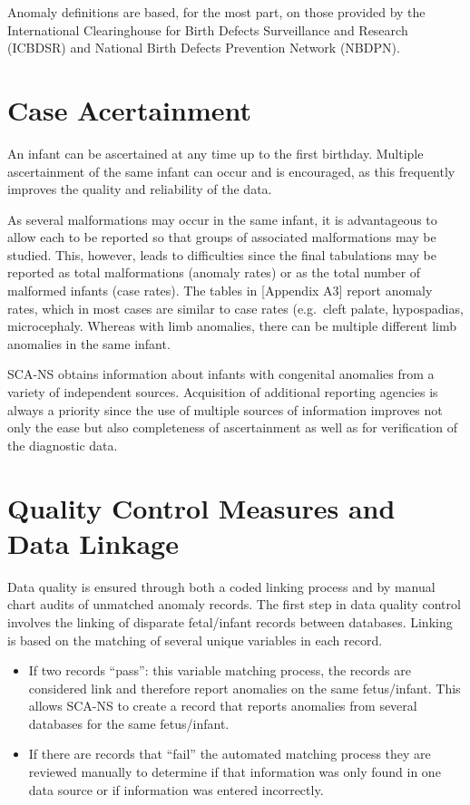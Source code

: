 \documentclass[
]{krantz}
\begin{document}
Anomaly definitions are based, for the most part, on those provided by the International Clearinghouse for Birth Defects Surveillance and Research (ICBDSR) and National Birth Defects Prevention Network (NBDPN).

\hypertarget{section12}{%
\section{Case Acertainment}\label{section12}}

An infant can be ascertained at any time up to the first birthday. Multiple ascertainment of the same infant can occur and is encouraged, as this frequently improves the quality and reliability of the data.

As several malformations may occur in the same infant, it is advantageous to allow each to be reported so that groups of associated malformations may be studied. This, however, leads to difficulties since the final tabulations may be reported as total malformations (anomaly rates) or as the total number of malformed infants (case rates). The tables in {[}Appendix A3{]} report anomaly rates, which in most cases are similar to case rates (e.g.~cleft palate, hypospadias, microcephaly. Whereas with limb anomalies, there can be multiple different limb anomalies in the same infant.

SCA-NS obtains information about infants with congenital anomalies from a variety of independent sources. Acquisition of additional reporting agencies is always a priority since the use of multiple sources of information improves not only the ease but also completeness of ascertainment as well as for verification of the diagnostic data.

\hypertarget{section13}{%
\section{Quality Control Measures and Data Linkage}\label{section13}}

Data quality is ensured through both a coded linking process and by manual chart audits of unmatched anomaly records. The first step in data quality control involves the linking of disparate fetal/infant records between databases. Linking is based on the matching of several unique variables in each record.

\begin{itemize}
\item
  If two records ``pass'': this variable matching process, the records are considered link and therefore report anomalies on the same fetus/infant. This allows SCA-NS to create a record that reports anomalies from several databases for the same fetus/infant.
\item
  If there are records that ``fail'' the automated matching process they are reviewed manually to determine if that information was only found in one data source or if information was entered incorrectly.
\end{itemize}
\end{document}
